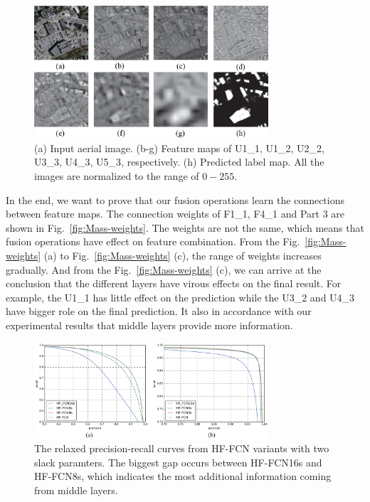 \begin{figure}
\begin{center}
\includegraphics[width=8.7cm]{Figures/feature_maps.eps}
\caption{(a) Input aerial image. (b-g) Feature maps of U1\_1, U1\_2, U2\_2, U3\_3, U4\_3, U5\_3, respectively. (h) Predicted label map. All the images are normalized to the range of ${0-255}$.}
\label{fig:feature_maps}
\end{center}
\end{figure}


In the end, we want to prove that our fusion operations learn the connections between feature maps. The connection weights of F1\_1, F4\_1 and Part 3 are shown in Fig.~\ref{fig:Mass-weights}.
The weights are not the same, which means that fusion operations have effect on feature combination.
From the Fig.~\ref{fig:Mass-weights} (a) to Fig.~\ref{fig:Mass-weights} (c), the range of weights increases gradually. And from the Fig.~\ref{fig:Mass-weights} (c), we can arrive at the conclusion that the different layers have virous effects on the final result.
For example, the U1\_1 has little effect on the prediction while the U3\_2 and U4\_3 have bigger role on the final prediction.
It also in accordance with our experimental results that middle layers provide more information.

\begin{figure}
\vspace{-0.2cm}
\setlength{\abovecaptionskip}{-0cm}
\setlength{\belowcaptionskip}{-1.5cm}  
\centering
\includegraphics[width=8.7cm]{Figures/HF-FCN-variant-PR.eps}
\caption{The relaxed precision-recall curves from HF-FCN variants with two slack paramters. The biggest gap occurs between HF-FCN16s and HF-FCN8s, which indicates the most additional information coming from middle layers.}
\label{fig:Mass-variants-PR}
\end{figure}

